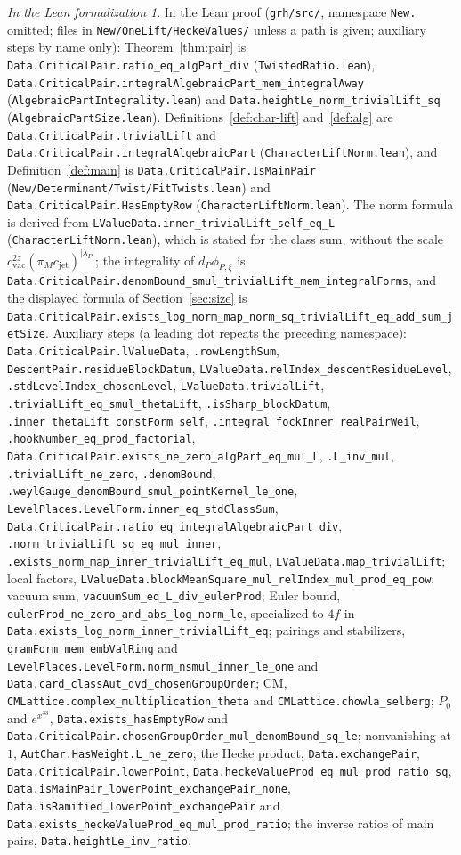 \documentclass[reqno]{amsart}
\theoremstyle{definition}
\theoremstyle{plain}
\theoremstyle{remark}
\newtheorem*{leanremark}{In the Lean formalization}
\newcommand{\cvac}{c_{\mathrm{vac}}}
\newcommand{\cjet}{c_{\mathrm{jet}}}
\newcommand{\tl}[1]{\texttt{#1}}
\begin{document}
\begin{leanremark}
\raggedright In the Lean proof \cite{GL} (\tl{grh/src/}, namespace \tl{New.} omitted; files in \tl{New/OneLift/HeckeValues/} unless a path is given; auxiliary steps by name only): Theorem~\ref{thm:pair} is \tl{Data.CriticalPair.ratio\_eq\_algPart\_div} (\tl{TwistedRatio.lean}), \tl{Data.CriticalPair.integralAlgebraicPart\_mem\_integralAway} (\tl{AlgebraicPartIntegrality.lean}) and \tl{Data.heightLe\_norm\_trivialLift\_sq} (\tl{AlgebraicPartSize.lean}).  Definitions~\ref{def:char-lift} and~\ref{def:alg} are \tl{Data.CriticalPair.trivialLift} and \tl{Data.CriticalPair.integralAlgebraicPart} (\tl{CharacterLiftNorm.lean}), and Definition~\ref{def:main} is \tl{Data.CriticalPair.IsMainPair} (\tl{New/Determinant/Twist/FitTwists.lean}) and \tl{Data.CriticalPair.HasEmptyRow} (\tl{CharacterLiftNorm.lean}).  The norm formula is derived from \tl{LValueData.inner\_trivialLift\_self\_eq\_L} (\tl{CharacterLiftNorm.lean}), which is stated for the class sum, without the scale \(\cvac^{2z}(\pi_M\cjet)^{\lvert\lambda_P\rvert}\); the integrality of \(d_P\phi_{P,\xi}\) is \tl{Data.CriticalPair.denomBound\_smul\_trivialLift\_mem\_integralForms}, and the displayed formula of Section~\ref{sec:size} is \tl{Data.CriticalPair.exists\_log\_norm\_map\_norm\_sq\_\allowbreak trivialLift\_eq\_add\_sum\_jetSize}.  Auxiliary steps (a leading dot repeats the preceding namespace): \tl{Data.CriticalPair.lValueData}, \tl{.rowLengthSum}, \tl{DescentPair.residueBlockDatum}, \tl{LValueData.relIndex\_descentResidueLevel}, \tl{.stdLevelIndex\_chosenLevel}, \tl{LValueData.trivialLift}, \tl{.trivialLift\_eq\_smul\_thetaLift}, \tl{.isSharp\_blockDatum}, \tl{.inner\_thetaLift\_constForm\_self}, \tl{.integral\_fockInner\_realPairWeil}, \tl{.hookNumber\_eq\_prod\_factorial}, \tl{Data.CriticalPair.exists\_ne\_zero\_algPart\_eq\_mul\_L}, \tl{.L\_inv\_mul}, \tl{.trivialLift\_ne\_zero}, \tl{.denomBound}, \tl{.weylGauge\_denomBound\_smul\_pointKernel\_le\_one}, \tl{LevelPlaces.LevelForm.inner\_eq\_stdClassSum}, \tl{Data.CriticalPair.ratio\_eq\_integralAlgebraicPart\_div}, \tl{.norm\_trivialLift\_sq\_eq\_mul\_inner}, \tl{.exists\_norm\_map\_inner\_trivialLift\_eq\_mul}, \tl{LValueData.map\_trivialLift}; local factors, \tl{LValueData.blockMeanSquare\_mul\_relIndex\_mul\_prod\_eq\_pow}; vacuum sum, \tl{vacuumSum\_eq\_L\_div\_eulerProd}; Euler bound, \tl{eulerProd\_ne\_zero\_and\_abs\_log\_norm\_le}, specialized to \(4f\) in \tl{Data.exists\_log\_norm\_inner\_trivialLift\_eq}; pairings and stabilizers, \tl{gramForm\_mem\_embValRing} and \tl{LevelPlaces.LevelForm.norm\_nsmul\_inner\_le\_one} and \tl{Data.card\_classAut\_dvd\_chosenGroupOrder}; CM, \tl{CMLattice.complex\_multiplication\_theta} and \tl{CMLattice.chowla\_selberg}; \(P_0\) and \(e^{x^{33}}\), \tl{Data.exists\_hasEmptyRow} and \tl{Data.CriticalPair.chosenGroupOrder\_mul\_denomBound\_sq\_le}; nonvanishing at \(1\), \tl{AutChar.HasWeight.L\_ne\_zero}; the Hecke product, \tl{Data.exchangePair}, \tl{Data.CriticalPair.lowerPoint}, \tl{Data.heckeValueProd\_eq\_mul\_prod\_ratio\_sq}, \tl{Data.isMainPair\_lowerPoint\_exchangePair\_none}, \tl{Data.isRamified\_lowerPoint\_exchangePair} and \tl{Data.exists\_heckeValueProd\_eq\_mul\_prod\_ratio}; the inverse ratios of main pairs, \tl{Data.heightLe\_inv\_ratio}.

\end{leanremark}
\end{document}
